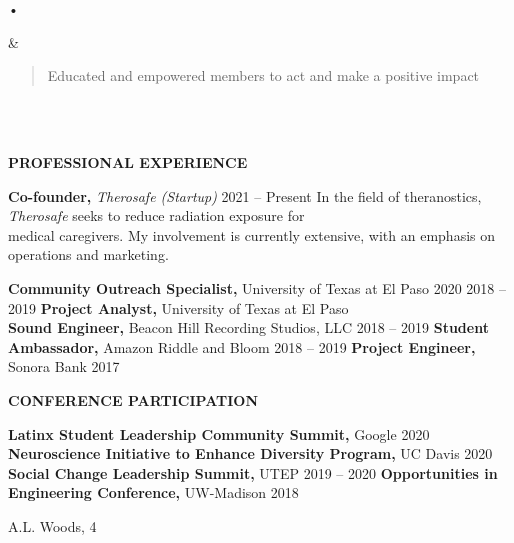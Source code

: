 \documentclass[
]{article}
\begin{document}
\begin{longtable}[]
\begin{minipage}[b]{\linewidth}\raggedleft
•
\end{minipage} & \begin{minipage}[b]{\linewidth}\raggedright
\begin{quote}
Educated and empowered members to act and make a positive impact
\end{quote}
\end{minipage} \\
 \\
\midrule\noalign{}
\endhead
\bottomrule\noalign{}
\endlastfoot
\end{longtable}

\textbf{PROFESSIONAL EXPERIENCE}

\textbf{Co-founder,} \emph{Therosafe (Startup)} 2021 -- Present In the
field of theranostics, \emph{Therosafe} seeks to reduce radiation
exposure for\\
medical caregivers. My involvement is currently extensive, with an
emphasis on\\
operations and marketing.

\textbf{Community Outreach Specialist,} University of Texas at El Paso
2020 2018 -- 2019 \textbf{Project Analyst,} University of Texas at El
Paso\\
\textbf{Sound Engineer,} Beacon Hill Recording Studios, LLC 2018 -- 2019
\textbf{Student Ambassador,} Amazon \textbar{} Riddle and Bloom 2018 --
2019 \textbf{Project Engineer,} Sonora Bank 2017

\textbf{CONFERENCE PARTICIPATION}

\textbf{Latinx Student Leadership Community Summit,} Google 2020
\textbf{Neuroscience Initiative to Enhance Diversity Program,} UC Davis
2020 \textbf{Social Change Leadership Summit,} UTEP 2019 -- 2020
\textbf{Opportunities in Engineering Conference,} UW-Madison 2018

A.L. Woods, 4
\end{document}
